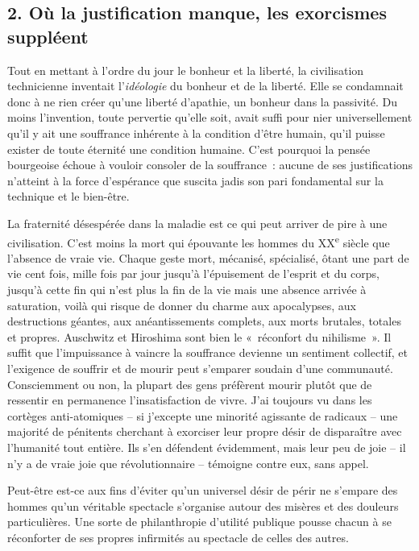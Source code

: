 \documentclass[french,twoside]{book} %
\begin{document}
\subsection[{2. Où la justification manque, les exorcismes suppléent}]{\textsc{2.} Où la justification manque, les exorcismes suppléent}
\noindent Tout en mettant à l’ordre du jour le bonheur et la liberté, la civilisation technicienne inventait l’\emph{idéologie} du bonheur et de la liberté. Elle se condamnait donc à ne rien créer qu’une liberté d’apathie, un bonheur dans la passivité. Du moins l’invention, toute pervertie qu’elle soit, avait suffi pour nier universellement qu’il y ait une souffrance inhérente à la condition d’être humain, qu’il puisse exister de toute éternité une condition humaine. C’est pourquoi la pensée bourgeoise échoue à vouloir consoler de la souffrance : aucune de ses justifications n’atteint à la force d’espérance que suscita jadis son pari fondamental sur la technique et le bien-être.\par
La fraternité désespérée dans la maladie est ce qui peut arriver de pire à une civilisation. C’est moins la mort qui épouvante les hommes du XX\textsuperscript{e} siècle que l’absence de vraie vie. Chaque geste mort, mécanisé, spécialisé, ôtant une part de vie cent fois, mille fois par jour jusqu’à l’épuisement de l’esprit et du corps, jusqu’à cette fin qui n’est plus la fin de la vie mais une absence arrivée à saturation, voilà qui risque de donner du charme aux apocalypses, aux destructions géantes, aux anéantissements complets, aux morts brutales, totales et propres. Auschwitz et Hiroshima sont bien le « réconfort du nihilisme ». Il suffit que l’impuissance à vaincre la souffrance devienne un sentiment collectif, et l’exigence de souffrir et de mourir peut s’emparer soudain d’une communauté. Consciemment ou non, la plupart des gens préfèrent mourir plutôt que de ressentir en permanence l’insatisfaction de vivre. J’ai toujours vu dans les cortèges anti-atomiques – si j’excepte une minorité agissante de radicaux – une majorité de pénitents cherchant à exorciser leur propre désir de disparaître avec l’humanité tout entière. Ils s’en défendent évidemment, mais leur peu de joie – il n’y a de vraie joie que révolutionnaire – témoigne contre eux, sans appel.\par
Peut-être est-ce aux fins d’éviter qu’un universel désir de périr ne s’empare des hommes qu’un véritable spectacle s’organise autour des misères et des douleurs particulières. Une sorte de philanthropie d’utilité publique pousse chacun à se réconforter de ses propres infirmités au spectacle de celles des autres.\par
\end{document}
